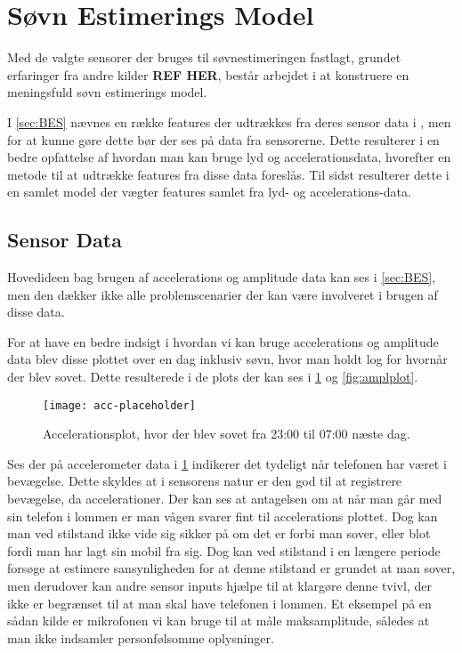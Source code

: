 \section{Søvn Estimerings Model}
Med de valgte sensorer der bruges til søvnestimeringen fastlagt, grundet erfaringer fra andre kilder \textbf{REF HER}, består arbejdet i at konstruere en meningsfuld søvn estimerings model.

I \cref{sec:BES} nævnes en række features der udtrækkes fra deres sensor data i \citet{6563918}, men for at kunne gøre dette bør der ses på data fra sensorerne.
Dette resulterer i en bedre opfattelse af hvordan man kan bruge lyd og accelerationsdata, hvorefter en metode til at udtrække features fra disse data foreslås.
Til sidst resulterer dette i en samlet model der vægter features samlet fra lyd- og accelerations-data.

\subsection{Sensor Data}
Hovedideen bag brugen af accelerations og amplitude data kan ses i \cref{sec:BES}, men den dækker ikke alle problemscenarier der kan være involveret i brugen af disse data.

For at have en bedre indsigt i hvordan vi kan bruge accelerations og amplitude data blev disse plottet over en dag inklusiv søvn, hvor man holdt log for hvornår der blev sovet.
Dette resulterede i de plots der kan ses i \cref{fig:accplot} og \cref{fig:amplplot}.

\begin{figure}[h]
	\centering
	\texttt{[image: acc-placeholder]}
	\caption{Accelerationsplot, hvor der blev sovet fra 23:00 til 07:00 næste dag.}\label{fig:accplot}
\end{figure}

Ses der på accelerometer data i \cref{fig:accplot} indikerer det tydeligt når telefonen har været i bevægelse.
Dette skyldes at i sensorens natur er den god til at registrere bevægelse, da accelerationer.
Der kan ses at antagelsen om at når man går med sin telefon i lommen er man vågen svarer fint til accelerations plottet.
Dog kan man ved stilstand ikke vide sig sikker på om det er forbi man sover, eller blot fordi man har lagt sin mobil fra sig.
Dog kan ved stilstand i en længere periode forsøge at estimere sansynligheden for at denne stilstand er grundet at man sover, men derudover kan andre sensor inputs hjælpe til at klargøre denne tvivl, der ikke er begrænset til at man skal have telefonen i lommen.
Et eksempel på en sådan kilde er mikrofonen vi kan bruge til at måle maksamplitude, således at man ikke indsamler personfølsomme oplysninger.

